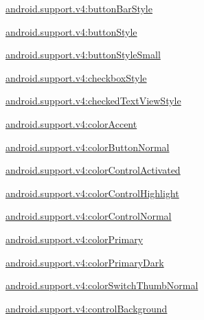 {\ttfamily \hyperlink{classandroid_1_1support_1_1v4_1_1R_1_1styleable_a833b29c75685e8a0ac239143d3e6fb6e}{android.\+support.\+v4\+:button\+Bar\+Style}}

{\ttfamily \hyperlink{classandroid_1_1support_1_1v4_1_1R_1_1styleable_a0a6f685c4d17c8080102fccc12ae235a}{android.\+support.\+v4\+:button\+Style}}

{\ttfamily \hyperlink{classandroid_1_1support_1_1v4_1_1R_1_1styleable_a94aeecf1f336663e0e81694de154135c}{android.\+support.\+v4\+:button\+Style\+Small}}

{\ttfamily \hyperlink{classandroid_1_1support_1_1v4_1_1R_1_1styleable_aa590bb5373f4b9fd718702b7c9454c66}{android.\+support.\+v4\+:checkbox\+Style}}

{\ttfamily \hyperlink{classandroid_1_1support_1_1v4_1_1R_1_1styleable_a62b92d2bf4651c1c6fe848d00c83ebe2}{android.\+support.\+v4\+:checked\+Text\+View\+Style}}

{\ttfamily \hyperlink{classandroid_1_1support_1_1v4_1_1R_1_1styleable_a70404ad3a5e8a8979dec037058215d60}{android.\+support.\+v4\+:color\+Accent}}

{\ttfamily \hyperlink{classandroid_1_1support_1_1v4_1_1R_1_1styleable_a348ced1d660bc34dcde74f87751119ba}{android.\+support.\+v4\+:color\+Button\+Normal}}

{\ttfamily \hyperlink{classandroid_1_1support_1_1v4_1_1R_1_1styleable_a0b39cc5b040b1cd3704ee635afa68425}{android.\+support.\+v4\+:color\+Control\+Activated}}

{\ttfamily \hyperlink{classandroid_1_1support_1_1v4_1_1R_1_1styleable_afc6290158c8ec3418e088f79325e48cd}{android.\+support.\+v4\+:color\+Control\+Highlight}}

{\ttfamily \hyperlink{classandroid_1_1support_1_1v4_1_1R_1_1styleable_a6b58e52a257785d873805b5e1779ea2b}{android.\+support.\+v4\+:color\+Control\+Normal}}

{\ttfamily \hyperlink{classandroid_1_1support_1_1v4_1_1R_1_1styleable_a7666c3232d0c44882bd1b7b81694ec22}{android.\+support.\+v4\+:color\+Primary}}

{\ttfamily \hyperlink{classandroid_1_1support_1_1v4_1_1R_1_1styleable_a86a4e758d00bd09c64f8125e28a09831}{android.\+support.\+v4\+:color\+Primary\+Dark}}

{\ttfamily \hyperlink{classandroid_1_1support_1_1v4_1_1R_1_1styleable_ae369a455853f8d39ed5e796399c80ca1}{android.\+support.\+v4\+:color\+Switch\+Thumb\+Normal}}

{\ttfamily \hyperlink{classandroid_1_1support_1_1v4_1_1R_1_1styleable_a69fdd6182b11eb1697d971b62e02f11b}{android.\+support.\+v4\+:control\+Background}}

